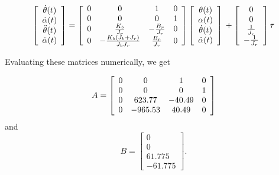 \[
    \left[\begin{array}{c}
            \dot{\theta}(t)  \\
            \dot{\alpha}(t)  \\
            \ddot{\theta}(t) \\
            \ddot{\alpha}(t)
        \end{array}\right] =
    \left[\begin{array}{c c c c}
            0 & 0                                          & 1                & 0 \\
            0 & 0                                          & 0                & 1 \\
            0 & \frac{K_b}{J_r}                            & -\frac{B_r}{J_r} & 0 \\
            0 & -\frac{K_b\left(J_b + J_r\right)}{J_b J_r} & \frac{B_r}{J_r}  & 0
        \end{array}\right]
    \left[\begin{array}{c}
            \theta(t)       \\
            \alpha(t)       \\
            \dot{\theta}(t) \\
            \dot{\alpha}(t)
        \end{array}\right] \\ +
    \left[\begin{array}{c}
            0             \\
            0             \\
            \frac{1}{J_r} \\
            -\frac{1}{J_r}
        \end{array}\right] \tau
\]

Evaluating these matrices numerically, we get

\[
    A =
    \left[\begin{array}{c c c c}
            0 & 0       & 1      & 0 \\
            0 & 0       & 0      & 1 \\
            0 & 623.77  & -40.49 & 0 \\
            0 & -965.53 & 40.49  & 0
        \end{array}\right]
\]
and
\[
    B =
    \left[\begin{array}{c}
            0      \\
            0      \\
            61.775 \\
            -61.775
        \end{array}\right].
\]

